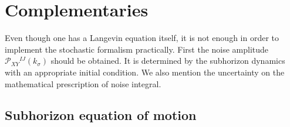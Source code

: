 \documentclass[a4paper,11pt]{article}
\newcommand{\calP}{\mathcal{P}}
\begin{document}



\section{Complementaries}\label{sec: complementaries}

Even though one has a Langevin equation itself, it is not enough in order to implement the stochastic formalism practically.
First the noise amplitude $\calP_{XY}{}^{IJ}(k_\sigma)$ should be obtained.
It is determined by the subhorizon dynamics with an appropriate initial condition.
We also mention the uncertainty on the mathematical prescription of noise integral.


\subsection{Subhorizon equation of motion}\label{sec: UV EoM}
\end{document}
